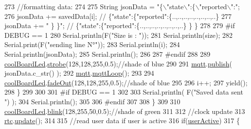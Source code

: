 \begin{DoxyCode}
273             \textcolor{comment}{//formatting data:}
274         
275             String jsonData = \textcolor{stringliteral}{"\{\(\backslash\)"state\(\backslash\)":\{\(\backslash\)"reported\(\backslash\)":"};
276             jsonData += savedData[i]; \textcolor{comment}{// \{"state":\{"reported":\{..,..,..,..,..,..,..,..\}}
277             jsonData += \textcolor{stringliteral}{" \} \}"}; \textcolor{comment}{// \{"state":\{"reported":\{..,..,..,..,..,..,..,..\}  \} \}}
278 
279 \textcolor{preprocessor}{        #if DEBUG == 1 }
280             Serial.println(F(\textcolor{stringliteral}{"Size is : "}));
281             Serial.println(size);
282             Serial.print(F(\textcolor{stringliteral}{"sending line N°"}));
283             Serial.println(i);
284             Serial.println(jsonData);
285             Serial.println();
286 
287 \textcolor{preprocessor}{        #endif}
288 
289             \hyperlink{classCoolBoard_a1b1d3c684a5baa56b08486e192fd8e97}{coolBoardLed}.\hyperlink{classCoolBoardLed_ad5f0de4c628cbfbf49896042831c64ad}{strobe}(128,128,255,0.5);\textcolor{comment}{//shade of blue}
290         
291             \hyperlink{classCoolBoard_a2399f44d7c23c1149a335cb3b46d90f1}{mqtt}.\hyperlink{classCoolMQTT_ace977b3e90ab14b1199fe5c4fb0a13ec}{publish}( jsonData.c\_str() );
292             \hyperlink{classCoolBoard_a2399f44d7c23c1149a335cb3b46d90f1}{mqtt}.\hyperlink{classCoolMQTT_aa5eaae967b562b62cbcf2b8d81f6e5d5}{mqttLoop}();
293         
294             \hyperlink{classCoolBoard_a1b1d3c684a5baa56b08486e192fd8e97}{coolBoardLed}.\hyperlink{classCoolBoardLed_a93d545679237e8cc858324367149775c}{fadeOut}(128,128,255,0.5);\textcolor{comment}{//shade of blue}
295             
296             i++;
297             yield();
298         \}       
299 
300 
301 \textcolor{preprocessor}{    #if DEBUG == 1}
302 
303         Serial.println( F(\textcolor{stringliteral}{"Saved data sent "}) );
304         Serial.println();
305     
306 \textcolor{preprocessor}{    #endif}
307 
308     \}
309 
310     \hyperlink{classCoolBoard_a1b1d3c684a5baa56b08486e192fd8e97}{coolBoardLed}.\hyperlink{classCoolBoardLed_a96e1ea13003eee34c9dbcef340404426}{blink}(128,255,50,0.5);\textcolor{comment}{//shade of green}
311 
312     \textcolor{comment}{//clock update}
313     \hyperlink{classCoolBoard_a50d2a6716879d64a85f3c6b44ad63275}{rtc}.\hyperlink{classCoolTime_aae601f795452cfa48d9fb337aed483a8}{update}();
314 
315     \textcolor{comment}{//read user data if user is active}
316     \textcolor{keywordflow}{if}(\hyperlink{classCoolBoard_a6395459131d6889a3005f79c7a35e964}{userActive})
317     \{

\end{DoxyCode}
